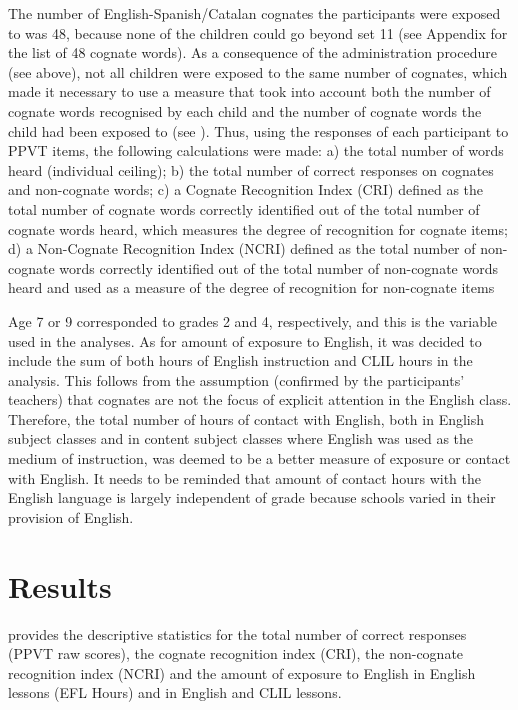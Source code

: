 \documentclass[output=paper,modfonts,nonflat,newtxmath]{langsci/langscibook}
\begin{document}
 {The number of English-Spanish/Catalan cognates the participants were exposed to was 48, because none of the children could go beyond set 11 (see Appendix for the list of 48 cognate words). As a consequence of the administration procedure (see above), not all children were exposed to the same number of cognates, which made it necessary to use a measure that took into account both the number of cognate words recognised by each child and the number of cognate words the child had been exposed to (see \citealt{MuñozEtAl2018}). Thus, using the responses of each participant to PPVT items, the following calculations were made: a) the total number of words heard (individual ceiling); b) the total number of correct responses on cognates and non-cognate words; c) a Cognate Recognition Index (CRI) defined as the total number of cognate words correctly identified out of the total number of cognate words heard, which measures the degree of recognition for cognate items; d) a Non-Cognate Recognition Index (NCRI) defined as the total number of non-cognate words correctly identified out of the total number of non-cognate words heard and used as a measure of the degree of recognition for non-cognate items}

{  }{Age 7 or 9 corresponded to grades 2 and 4, respectively, and this is the variable used in the analyses. As for amount of exposure to English, it was decided to include the sum of both hours of English instruction and CLIL hours in the analysis. This follows from the assumption (confirmed by the participants’ teachers) that cognates are not the focus of explicit attention in the English class. Therefore, the total number of hours of contact with English, both in English subject classes and in content subject classes where English was used as the medium of instruction, was deemed to be a better measure of exposure or contact with English. It needs to be reminded that amount of contact hours with the English language is largely independent of grade because schools varied in their provision of English.}


\section{Results}
\label{sec:munoz:4}

{ provides the descriptive statistics for the total number of correct responses (PPVT raw scores), the cognate recognition index (CRI), the non-cognate recognition index (NCRI) and the amount of exposure to English in English lessons (EFL Hours) and in English and CLIL lessons.}
\end{document}
